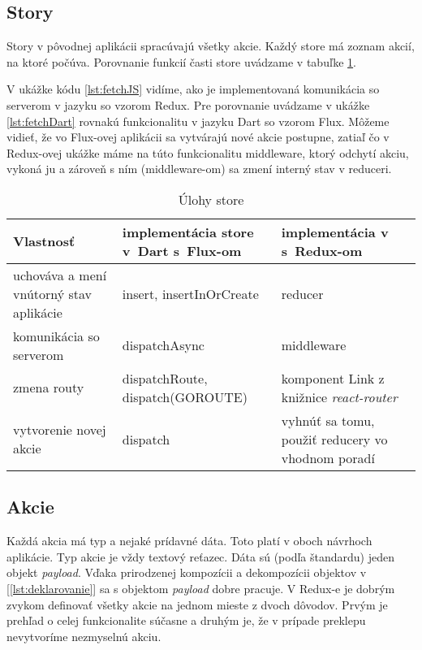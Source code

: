 \subsection{Story}
Story v pôvodnej aplikácii spracúvajú všetky akcie. Každý store má zoznam akcií, na ktoré počúva. Porovnanie funkcií časti store uvádzame v tabuľke \ref{table:store}.

V ukážke kódu \ref{lst:fetchJS} vidíme, ako je implementovaná komunikácia so serverom v jazyku \JS{} so vzorom Redux. Pre porovnanie uvádzame v ukážke \ref{lst:fetchDart} rovnakú funkcionalitu v jazyku Dart so vzorom Flux. Môžeme vidieť, že vo Flux-ovej aplikácii sa vytvárajú nové akcie postupne, zatiaľ čo v Redux-ovej ukážke máme na túto funkcionalitu middleware, ktorý odchytí akciu, vykoná ju a zároveň s ním (middleware-om) sa zmení interný stav v reduceri.

\begin{table}
  \caption{Úlohy store}
  \label{table:store}
  \begin{tabular}{| p{4cm} | p{5cm} | p{5cm} |}
   \hline         %
     Vlastnosť & implementácia store v~Dart s~Flux-om & implementácia v~\JS{} s~Redux-om \\
    \hline
    \hline
     uchováva a mení vnútorný stav aplikácie & 
     insert, insertInOrCreate &
     reducer \\
    \hline
     komunikácia so serverom & 
     dispatchAsync & 
     middleware \\
    \hline
     zmena routy & 
     dispatchRoute, dispatch(GOROUTE) & 
     komponent Link z knižnice \emph{react-router} \\
    \hline
     vytvorenie novej akcie & 
     dispatch & 
     vyhnúť sa tomu, použiť reducery vo vhodnom poradí \\%
    \hline
   \end{tabular}
\end{table}



\subsection{Akcie}
Každá akcia má typ a nejaké prídavné dáta. %
Toto platí v oboch návrhoch aplikácie. Typ akcie je vždy textový reťazec. Dáta sú (podľa štandardu) jeden objekt \emph{payload}. 
Vďaka prirodzenej kompozícii a dekompozícii objektov v \JS{} [\ref{lst:deklarovanie}] sa s objektom \emph{payload} dobre pracuje. 
V Redux-e je dobrým zvykom definovať všetky akcie na jednom mieste z dvoch dôvodov. Prvým je prehľad o celej funkcionalite súčasne a druhým je, že v prípade preklepu nevytvoríme nezmyselnú akciu.

